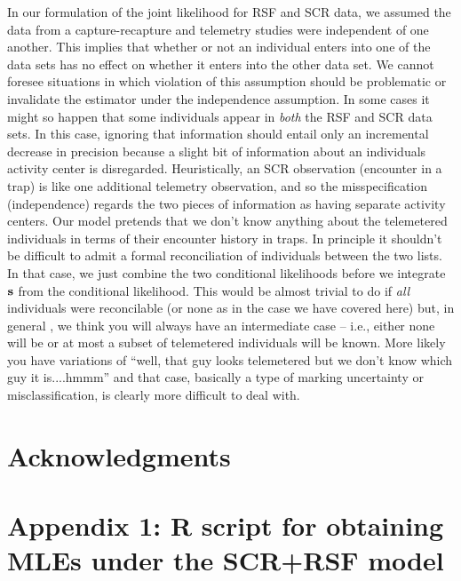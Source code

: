\documentclass[12pt]{article}
\begin{document}
In our formulation of the joint likelihood for RSF and SCR data, we
assumed the data from a capture-recapture and telemetry studies were
independent of one another. This implies that whether or not an
individual enters into one of the data sets has no effect on whether
it enters into the other data set. We cannot foresee situations in
which violation of this assumption should be problematic or invalidate
the estimator under the independence assumption.  In some cases it
might so happen that some individuals appear in {\it both} the RSF and
SCR data sets. In this case, ignoring that information should entail
only an incremental decrease in precision because a slight bit of
information about an individuals activity center is
disregarded. Heuristically, an SCR observation (encounter in a trap)
is like one additional telemetry observation, and so the
misspecification (independence)
regards the
two pieces of information as having separate activity centers.
 Our model pretends that we don't know anything
about the telemetered individuals in terms of their encounter history
in traps.  In principle it shouldn't be difficult to admit a formal
reconciliation of individuals between the two lists. In that case, we
just combine the two conditional likelihoods before we integrate ${\bf
  s}$ from the conditional likelihood. This would be almost trivial to
do if {\it all} individuals were reconcilable (or none as in the case
we have covered here) but, in general , we think you will always have
an intermediate case -- i.e., either none will be or at most a subset
of telemetered individuals will be known. More likely you have variations of ``well, that
guy looks telemetered but we don't know which guy it is....hmmm'' and
that case, basically a type of marking uncertainty or
misclassification, is clearly more difficult to deal with.


\section*{Acknowledgments}






\section*{Appendix 1: {\bf R} script for obtaining MLEs under the SCR+RSF model}



\clearpage
\newpage
\end{document}
